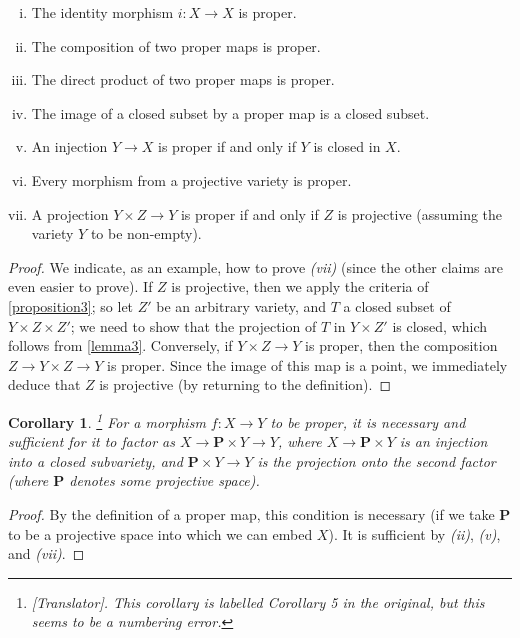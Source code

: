 \documentclass{article}
\theoremstyle{plain}
\newenvironment{proposition}[1]
    {\renewcommand\theinnercustomproposition{#1}\innercustomproposition}
    {\endinnercustomproposition}
\newtheorem*{corollary}{Corollary}
\theoremstyle{definition}
\newcommand{\PP}{\mathbf{P}}
\begin{document}
\begin{proposition}{4}
\label{proposition4}
  \begin{enumerate}[(i)]
    \item The identity morphism $i\colon X\to X$ is proper.
    \item The composition of two proper maps is proper.
    \item The direct product of two proper maps is proper.
    \item The image of a closed subset by a proper map is a closed subset.
    \item An injection $Y\to X$ is proper if and only if $Y$ is closed in $X$.
    \item Every morphism from a projective variety is proper.
    \item A projection $Y\times Z\to Y$ is proper if and only if $Z$ is projective (assuming the variety $Y$ to be non-empty).
  \end{enumerate}
\end{proposition}

\begin{proof}
  We indicate, as an example, how to prove \emph{(vii)} (since the other claims are even easier to prove).
  If $Z$ is projective, then we apply the criteria of \cref{proposition3};
  so let $Z'$ be an arbitrary variety, and $T$ a closed subset of $Y\times Z\times Z'$;
  we need to show that the projection of $T$ in $Y\times Z'$ is closed, which follows from \cref{lemma3}.
  Conversely, if $Y\times Z\to Y$ is proper, then the composition $Z\to Y\times Z\to Y$ is proper.
  Since the image of this map is a point, we immediately deduce that $Z$ is projective (by returning to the definition).
\end{proof}

\begin{corollary}
\label{corollary5}
  \footnote{\emph{[Translator]. This corollary is labelled \emph{Corollary 5} in the original, but this seems to be a numbering error.}}
  For a morphism $f\colon X\to Y$ to be proper, it is necessary and sufficient for it to factor as $X\to \PP\times Y\to Y$, where $X\to \PP\times Y$ is an injection into a closed subvariety, and $\PP\times Y\to Y$ is the projection onto the second factor (where $\PP$ denotes some projective space).
\end{corollary}

\begin{proof}
  By the definition of a proper map, this condition is necessary (if we take $\PP$ to be a projective space into which we can embed $X$).
  It is sufficient by \emph{(ii)}, \emph{(v)}, and \emph{(vii)}.
\end{proof}
\end{document}

